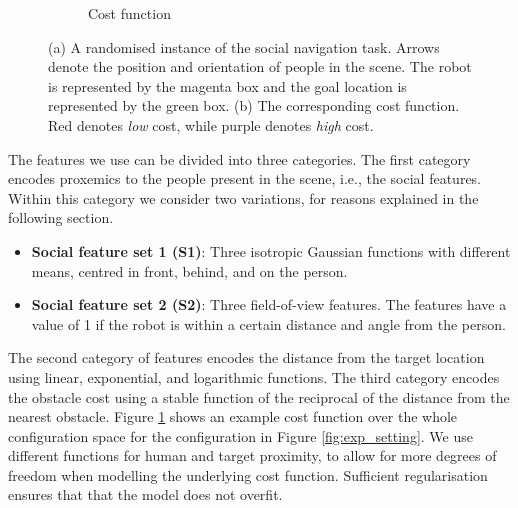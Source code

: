\documentclass[a4paper,11pt]{report}
\begin{document}
\begin{figure}[tbh]
\begin{subfigure}[b]{0.35\columnwidth}
    \caption{Cost function}
    \label{fig:cost_f}
  \end{subfigure} 

  \caption{(a) A randomised instance of the social navigation task. Arrows denote the position and orientation of people in the scene. The robot is represented by the magenta box and the goal location is represented by the green box. (b) The corresponding cost function. Red denotes \emph{low} cost, while purple denotes \emph{high} cost.}

    \vspace{-2mm}

  \label{fig:setting}
  \end{figure}

	The features we use can be divided into three categories. The first category encodes proxemics to the people present in the scene, i.e., the social features. Within this category we consider two variations, for reasons explained in the following section.
	\begin{itemize}
		\item {\bf Social feature set 1 (S1)}: Three isotropic Gaussian functions with different means, centred in front, behind, and on the person.
		\item {\bf Social feature set 2 (S2)}: Three field-of-view features. The features have a value of 1 if the robot is within a certain distance and angle from the person.
	\end{itemize}
	  The second category of features encodes the distance from the target location using linear, exponential, and logarithmic functions. The third category encodes the obstacle cost using a stable function of the reciprocal of the distance from the nearest obstacle. Figure \ref{fig:cost_f} shows an example cost function over the whole configuration space for the configuration in Figure \ref{fig:exp_setting}. We use different functions for human and target proximity, to allow for more degrees of freedom when modelling the underlying cost function. Sufficient regularisation ensures that that the model does not overfit.
\end{document}
